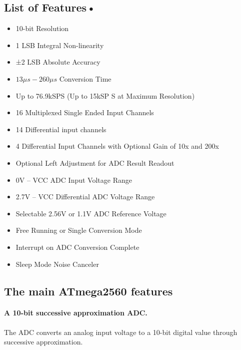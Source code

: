 \documentclass[english]{article}
\begin{document}
\subsection{List of Features•}
\begin{itemize}
\item 10-bit Resolution
\item 1 LSB Integral Non-linearity
\item ±2 LSB Absolute Accuracy
\item $13\mu s - 260 \mu s$ Conversion Time
\item Up to 76.9kSPS (Up to 15kSP S at Maximum Resolution)
\item 16 Multiplexed Single Ended Input Channels
\item 14 Differential input channels
\item 4 Differential Input Channels with Optional Gain of 10x and 200x
\item Optional Left Adjustment for ADC Result Readout
\item 0V – VCC ADC Input Voltage Range
\item 2.7V – VCC Differential ADC Voltage Range
\item Selectable 2.56V or 1.1V ADC Reference Voltage 
\item Free Running or Single Conversion Mode
\item Interrupt on ADC Conversion Complete
\item Sleep Mode Noise Canceler
\end{itemize}
\subsection{The main ATmega2560 features}
\paragraph{A 10-bit successive approximation ADC.} The ADC converts an analog input voltage to a 10-bit digital value through successive approximation.
\end{document}
